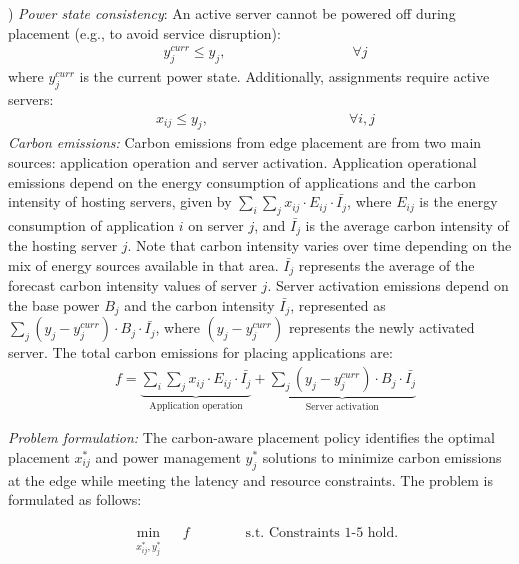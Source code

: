 ) \textit{Power state consistency}: An active server cannot be powered off during placement (e.g., to avoid service disruption):
{\small 
\begin{align}
    \label{eq:server_keep_on}
    & y_j^{curr} \leq y_j, \quad \quad \quad \quad  \quad \quad \quad \quad \quad \forall j 
\end{align}
}
where $y_j^{curr}$ is the current power state. Additionally, assignments require active servers:  
{\small 
\begin{align}
    \label{eq:server_on}
    & x_{ij} \leq y_j, \quad \quad \quad \quad \quad  \quad \quad \quad \quad \quad \forall i, j 
\end{align}
}
\textit{Carbon emissions:} Carbon emissions from edge placement are from two main sources: application operation and server activation. Application operational emissions depend on the energy consumption of applications and the carbon intensity of hosting servers, given by $\sum_i \sum_j x_{ij} \cdot E_{ij} \cdot \bar{I_j}$, where $E_{ij}$ is the energy consumption of application $i$ on server $j$, and $\bar{I_j}$ is the average carbon intensity of the hosting server $j$. Note that carbon intensity varies over time depending on the mix of energy sources available in that area. $\bar{I_j}$ represents the average of the forecast carbon intensity values of server $j$. Server activation emissions depend on the base power $B_j$ and the carbon intensity $\bar{I_j}$, represented as $\sum_j (y_j - y_j^{curr}) \cdot B_{j} \cdot \bar{I_j}$, where $(y_j - y_j^{curr})$ represents the newly activated server. The total carbon emissions for placing applications are: 
{\small 
\begin{align}
    \label{eq:emission}
    & f =  \underbrace{\sum_i \sum_j x_{ij} \cdot E_{ij} \cdot \bar{I_j}}_{\text{Application operation}} + \underbrace{\sum_j (y_j - y_j^{curr}) \cdot B_j \cdot \bar{I_j}}_{\text{Server activation}}
\end{align}
}

\noindent \textit{Problem formulation:} The carbon-aware placement policy identifies the optimal placement $x_{ij}^*$ and power management $y_j^*$ solutions to minimize carbon emissions at the edge while meeting the latency and resource constraints. The problem is formulated as follows: 

{\small 
\begin{align}
    \label{eq:objective}
    & \min_{\substack{x_{ij}^*, y_j^*}}  \quad f  \quad \quad \quad \quad \text{s.t. Constraints 1-5 hold. }
\end{align}
}

